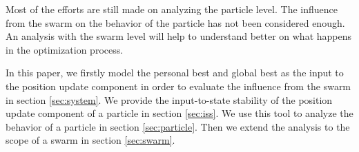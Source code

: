 Most of the efforts are still made on analyzing the particle level.
The influence from the swarm on the behavior of the particle has not been considered enough.
An analysis with the swarm level will help to understand better on what happens in the optimization process.

In this paper, we firstly model the personal best and global best as the input to the position update component in order to evaluate the influence from the swarm in section \ref{sec:system}.
We provide the input-to-state stability of the position update component of a particle in section \ref{sec:iss}.
We use this tool to analyze the behavior of a particle in section \ref{sec:particle}.
Then we extend the analysis to the scope of a swarm in section \ref{sec:swarm}.
